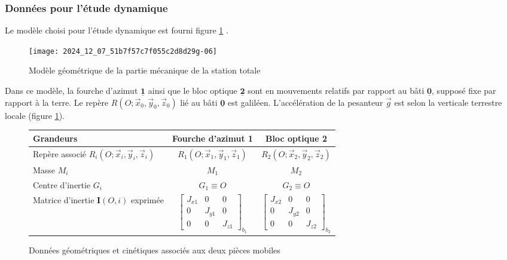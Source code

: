 \subsubsection{Données pour l'étude dynamique}
Le modèle choisi pour l'étude dynamique est fourni figure \ref{CCS_MP_2017:fig_09} .\\


\begin{figure}[!h]
\centering
\texttt{[image: 2024\_12\_07\_51b7f57c7f055c2d8d29g-06]}

\caption{Modèle géométrique de la partie mécanique de la station totale \label{CCS_MP_2017:fig_09}}
\end{figure}

Dans ce modèle, la fourche d'azimut $\underline{\mathbf{1}}$ ainsi que le bloc optique $\underline{\mathbf{2}}$ sont en mouvements relatifs par rapport au bâti $\underline{\mathbf{0}}$, supposé fixe par rapport à la terre. Le repère $R\left(O ; \vec{x}_{0}, \vec{y}_{0}, \vec{z}_{0}\right)$ lié au bâti $\underline{\mathbf{0}}$ est galiléen. L'accélération de la pesanteur $\vec{g}$ est selon la verticale terrestre locale (figure \ref{CCS_MP_2017:fig_09}).

\begin{figure}[!h]
\centering
\begin{tabular}{lcc}
\hline
\textbf{Grandeurs} & \textbf{Fourche d'azimut 1} & \textbf{Bloc optique 2} \\
\hline
Repère associé $R_{i}\left(O ; \vec{x}_{i}, \vec{y}_{i}, \vec{z}_{i}\right)$ & $R_{1}\left(O ; \vec{x}_{1}, \vec{y}_{1}, \vec{z}_{1}\right)$ & $R_{2}\left(O ; \vec{x}_{2}, \vec{y}_{2}, \vec{z}_{2}\right)$ \\
Masse $M_{i}$ & $M_{1}$ & $M_{2}$ \\
Centre d'inertie $G_{i}$ & $G_{1} \equiv O$ & $G_{2} \equiv O$ \\
Matrice d'inertie $\mathbf{I}(O, i)$ exprimée & $\left[\begin{array}{ccc}J_{x 1} & 0 & 0 \\ 0 & J_{y 1} & 0 \\ 0 & 0 & J_{z 1}\end{array}\right]_{b_{1}}$ & $\left[\begin{array}{ccc}J_{x 2} & 0 & 0 \\ 0 & J_{y 2} & 0 \\ 0 & 0 & J_{z 2}\end{array}\right]_{b_{2}}$ \\
\hline
\end{tabular}
\caption{Données géométriques et cinétiques associés aux deux pièces mobiles \label{CCS_MP_2017:fig_10}}
\end{figure}


